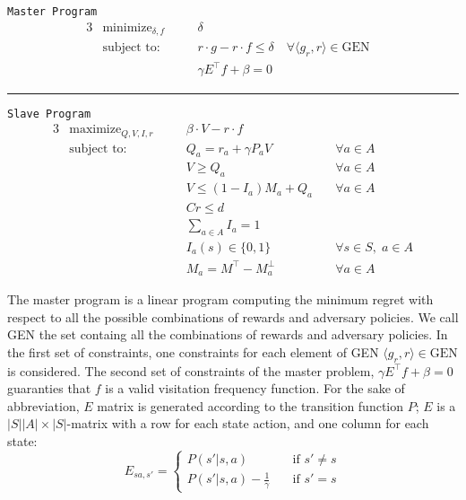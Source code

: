 \documentclass[runningheads,a4paper]{llncs}
\begin{document}

\begin{center}\label{minimax}
\texttt{Master Program}
\begin{alignat}{3}
&\text{minimize}_{\delta, f} && \delta & \\
&\text{subject to:}&\quad& r\cdot g - r \cdot f \leq \delta \quad \forall \langle g_r, r \rangle \in \text{GEN}\label{delta_cut}\\
&& \quad& \gamma E^{\top} f + \beta = 0 
\end{alignat}
\begin{center}
\noindent\rule{8cm}{0.4pt}
\end{center} 
\texttt{Slave Program}
\begin{alignat}{3}
&\text{maximize}_{Q, V, I, r} && \beta \cdot V - r \cdot f \\
&\text{subject to:} &\quad& Q_a = r_a + \gamma P_aV &\quad \forall a \in A\\
&& \quad& V \geq Q_a  &\quad \forall a \in A\\
&& \quad& V \leq (1-I_a)M_a + Q_a  &\quad \forall a \in A\\
&& \quad& Cr \leq d \\
&& \quad& \sum_{a \in A} I_a = 1  \label{eq:sum_I}\\
&& \quad& I_a(s) \in \{0, 1 \} &\quad \forall s \in S, \; a \in A \label{eq:bin_I}\\
&& \quad& M_a = M^{\top} - M_a^{\perp} &\quad \forall a \in A
\end{alignat}
\end{center}

The master program is a linear program computing the minimum regret with respect to all the possible combinations of rewards and adversary policies. We call GEN the set containg all the combinations of rewards and adversary policies. 
In the first set of constraints, one constraints for each element of GEN $\langle g_r, r \rangle \in \text{GEN}$ is considered. 
The second set of constraints of the master problem, $\gamma E ^{\top}f+ \beta = 0$ guaranties that $f$ is a valid visitation frequency function. For the sake of abbreviation, $E$ matrix is generated according to the transition function $P$; $E$ is a $|S||A| \times |S|$-matrix with a row for each state action, and one column for each state:
\[   
E_{sa,s'} = 
     \begin{cases}
       P(s'|s, a) &\quad \text{if } s' \neq s\\
       P(s'|s, a) - \frac{1}{\gamma} &\quad \text{if } s' = s
     \end{cases}
\] 
\end{document}
